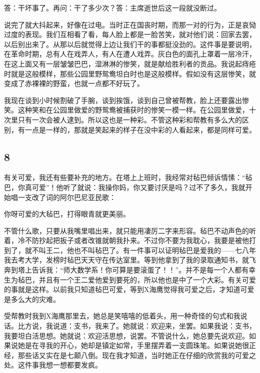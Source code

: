 答：干坏事了。再问：干了多少次？答：主席逝世后这一段就没断过。 

说完了就大抖起来，好像在过电。当时正在国丧时期，而那一对的行为，正是哀恸过度的表现。我们互相看了看，每人脸上都是一脸苦笑，就对他们说：回家去罢，以后别出来了。从那以后就觉得上边让我们干的事都挺没劲的。这件事是要说明，在革命时期，总有人在戏弄人，有人在遭人戏弄。灰白色的面孔上罩着一层冷汗，在这上面又有一层皱皱巴巴，湿淋淋的惨笑，就是献给胜利者的贡品。我说起痔疮时就是这般模样，那些公园里野鸳鸯坦白时也是这般模样。假如没有这层惨笑，就变成了赤裸裸的野蛮，也就一点都不好玩了。 

我现在谈到小时候割破了手腕，谈到挨饿，谈到自己曾被帮教，脸上还要露出惨笑。这种笑和在公园里做爱的野鸳鸯被捕获时的惨笑一模一样。在公园里做爱，十次里只有一次会被人逮到。所以这也是一种彩。不管这种彩和帮教有多么大的区别，有一点是一样的，那就是笑起来的样子在没中彩的人看起来，都是同样可爱。 

\subsection{8} 

有关可爱，我还有些要补充的地方。在塔上上班时，我经常对毡巴倾诉情愫：“毡巴，你真可爱”！他听了就说：我操你妈，你又要讨厌是吗？过不了多久，我就开始唱一支改了词的阿尔巴尼亚民歌： 

你呀可爱的大毡巴，打得眼青就更美丽。 

不管什么歌，只要从我嘴里唱出来，就只能用凄厉二字来形容。毡巴不动声色的听着，冷不防抄起把扳子或者改锥就朝我扑来。不过你不要为我耽心，我要是被他打到了，就不叫王二，他也不叫毡巴了。有一件事可以证明毡巴是爱我的——七八年我去考大学，发榜时毡巴天天守在传达室里。等到他拿到了我的录取通知书，就飞奔到塔上告诉我：“师大数学系！你可算是要滚蛋了！！”。并不是每一个人都有幸生为毡巴，并且有一个王二爱他爱到要死的，所以他也是中了一个大彩。有关可爱的事就是这样。以前我只知道毡巴可爱，等到X海鹰觉得我可爱之后，才知道可爱是多么大的灾难。 

受帮教时我到X海鹰那里去，她总是笑嘻嘻的低着头，用一种奇怪的句式和我说话。比方说，我说道：支书，我来了。她就说：欢迎来，坐罢。如果我说：支书，我要坦白活思想。她就说：欢迎活思想，说罢。不管说什么，她总要先说欢迎。如果说她是在寻我的开心，她却是镇定如常，手里摆弄着一支圆珠笔。如果说她很正经，那些话又实在是七颠八倒。现在我才知道，当时她正在仔细的欣赏我的可爱之处。这件事我想一想都要发疯。 

